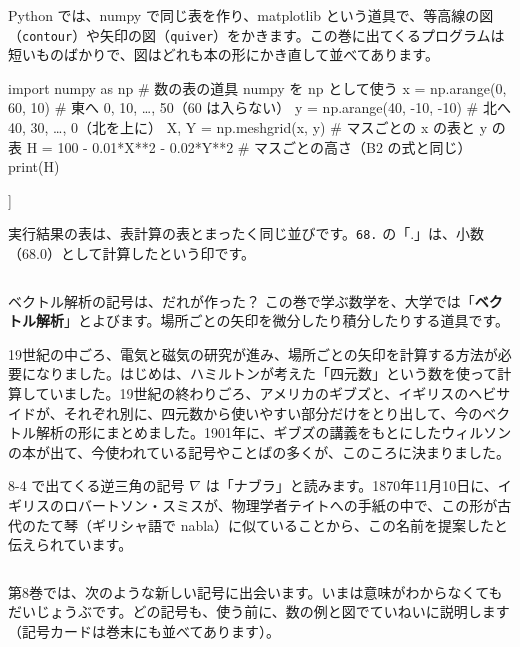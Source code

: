 Python では、numpy で同じ表を作り、matplotlib という道具で、等高線の図（\texttt{contour}）や矢印の図（\texttt{quiver}）をかきます。この巻に出てくるプログラムは短いものばかりで、図はどれも本の形にかき直して並べてあります。

\begin{bkcode}[Python]
import numpy as np               \# 数の表の道具 numpy を np として使う
x = np.arange(0, 60, 10)         \# 東へ 0, 10, …, 50（60 は入らない）
y = np.arange(40, -10, -10)      \# 北へ 40, 30, …, 0（北を上に）
X, Y = np.meshgrid(x, y)         \# マスごとの x の表と y の表
H = 100 - 0.01*X**2 - 0.02*Y**2  \# マスごとの高さ（B2 の式と同じ）
print(H)
\end{bkcode}
\begin{bkcodeout}[実行結果]
[[ 68.  67.  64.  59.  52.  43.]
 [ 82.  81.  78.  73.  66.  57.]
 [ 92.  91.  88.  83.  76.  67.]
 [ 98.  97.  94.  89.  82.  73.]
 [100.  99.  96.  91.  84.  75.]]
\end{bkcodeout}

\noindent 実行結果の表は、表計算の表とまったく同じ並びです。\texttt{68.} の「.」は、小数（68.0）として計算したという印です。

\begin{column}{ベクトル解析の記号は、だれが作った？}
この巻で学ぶ数学を、大学では「\textbf{ベクトル解析}」とよびます。場所ごとの矢印を微分したり積分したりする道具です。

19世紀の中ごろ、電気と磁気の研究が進み、場所ごとの矢印を計算する方法が必要になりました。はじめは、ハミルトンが考えた「四元数」という数を使って計算していました。19世紀の終わりごろ、アメリカのギブズと、イギリスのヘビサイドが、それぞれ別に、四元数から使いやすい部分だけをとり出して、今のベクトル解析の形にまとめました。1901年に、ギブズの講義をもとにしたウィルソンの本が出て、今使われている記号やことばの多くが、このころに決まりました。

8-4 で出てくる逆三角の記号 $\nabla$ は「ナブラ」と読みます。1870年11月10日に、イギリスのロバートソン・スミスが、物理学者テイトへの手紙の中で、この形が古代のたて琴（ギリシャ語で nabla）に似ていることから、この名前を提案したと伝えられています。
\end{column}


\label{bk:8-0:kigo}第8巻では、次のような新しい記号に出会います。いまは意味がわからなくてもだいじょうぶです。どの記号も、使う前に、数の例と図でていねいに説明します（記号カードは巻末にも並べてあります）。

